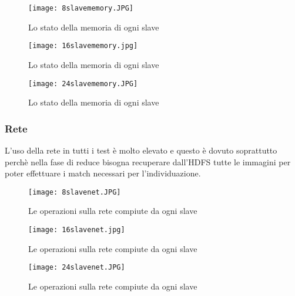 \begin{figure}
  \begin{center}
    \texttt{[image: 8slavememory.JPG]}
    \caption{Lo stato della memoria di ogni slave}
    \label{fig:8slavememory.JPG}
  \end{center}
\end{figure}

\begin{figure}
  \begin{center}
    \texttt{[image: 16slavememory.jpg]}
    \caption{Lo stato della memoria di ogni slave}
    \label{fig:16slavememory.JPG}
  \end{center}
\end{figure}

\begin{figure}
  \begin{center}
    \texttt{[image: 24slavememory.JPG]}
    \caption{Lo stato della memoria di ogni slave}
    \label{fig:24slavememory.JPG}
  \end{center}
\end{figure}

\subsubsection{Rete}
L'uso della rete in tutti i test è molto elevato e questo è dovuto soprattutto perchè nella fase di reduce bisogna recuperare dall'HDFS tutte le immagini per poter effettuare i match necessari per l'individuazione.

\begin{figure}
  \begin{center}
    \texttt{[image: 8slavenet.JPG]}
    \caption{Le operazioni sulla rete compiute da ogni slave}
    \label{fig:8slavenet.JPG}
  \end{center}
\end{figure}

\begin{figure}
  \begin{center}
    \texttt{[image: 16slavenet.jpg]}
    \caption{Le operazioni sulla rete compiute da ogni slave}
    \label{fig:16slavenet.JPG}
  \end{center}
\end{figure}

\begin{figure}
  \begin{center}
    \texttt{[image: 24slavenet.JPG]}
    \caption{Le operazioni sulla rete compiute da ogni slave}
    \label{fig:24slavenet.JPG}
  \end{center}
\end{figure}

